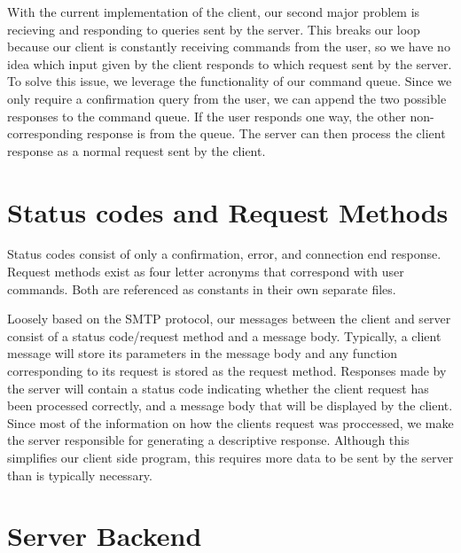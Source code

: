 \documentclass[12pt, ]{article}
\begin{document}
\begin{flushleft}
	With the current implementation of the client, our second major problem is recieving and responding to queries sent by the server. 
	This breaks our loop because our client is constantly receiving commands from the user, so we have no idea which input given by the client responds to which request sent by the server. 
	To solve this issue, we leverage the functionality of our command queue. Since we only require a confirmation query from the user, we can append the two possible responses to the command queue.
	If the user responds one way, the other non-corresponding response is from the queue.
	The server can then process the client response as a normal request sent by the client.
\end{flushleft}


\section{Status codes and Request Methods}

\begin{flushleft}
	Status codes consist of only a confirmation, error, and connection end response. Request methods exist as four letter acronyms that correspond with user commands. Both are referenced as constants in their own separate files.
\end{flushleft}

\begin{flushleft}
	Loosely based on the SMTP protocol, our messages between the client and server consist of a status code/request method and a message body. 
	Typically, a client message will store its parameters in the message body and any function corresponding to its request is stored as the request method.
	Responses made by the server will contain a status code indicating whether the client request has been processed correctly, and a message body that will be displayed by the client.
	Since most of the information on how the clients request was proccessed, we make the server responsible for generating a descriptive response.
	Although this simplifies our client side program, this requires more data to be sent by the server than is typically necessary.
\end{flushleft}

\section{Server Backend}
\end{document}
